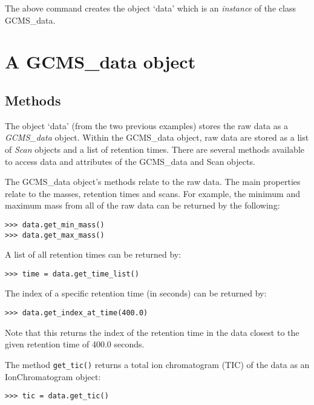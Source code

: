 \noindent
The above command creates the object `data' which is an {\em instance}
of the class GCMS\_data.

\section{A GCMS\_data object}

\subsection{Methods}


The object `data' (from the two previous examples) stores the raw data as a {\em
GCMS\_data} object. Within the GCMS\_data object, raw data are stored as a list
of {\em Scan} objects and a list of retention times.  There are several methods
available to access data and attributes of the GCMS\_data and Scan objects.

The GCMS\_data object's methods relate to the raw data. The main properties
relate to the masses, retention times and scans. For example, the
minimum and maximum mass from all of the raw data can be returned by the
following:

\begin{verbatim}
>>> data.get_min_mass()
>>> data.get_max_mass()
\end{verbatim}

A list of all retention times can be returned by:

\begin{verbatim}
>>> time = data.get_time_list()
\end{verbatim}

The index of a specific retention time (in seconds) can be returned by:

\begin{verbatim}
>>> data.get_index_at_time(400.0)
\end{verbatim}

\noindent
Note that this returns the index of the retention time in the
data closest to the given retention time of 400.0 seconds.

The method {\tt get\_tic()} returns a total ion chromatogram (TIC) of the data
as an IonChromatogram object:

\begin{verbatim}
>>> tic = data.get_tic()
\end{verbatim}

